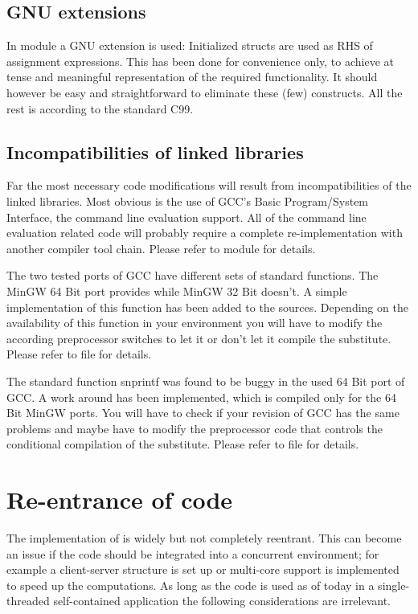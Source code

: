 \subsection{GNU extensions}

In module  a GNU extension is used: Initialized
structs are used as RHS of assignment expressions. This has been done
for convenience only, to achieve at tense and meaningful representation of
the required functionality. It should however be easy and straightforward
to eliminate these (few) constructs. All the rest is according to the
standard C99.


\subsection{Incompatibilities of linked libraries}

Far the most necessary code modifications will result from
incompatibilities of the linked libraries. Most obvious is the use of
GCC's Basic Program/System Interface, the command line evaluation support.
All of the command line evaluation related code will probably require a
complete re-implementation with another compiler tool chain. Please refer
to module  for details.

The two tested ports of GCC have different sets of standard functions. The
MinGW 64 Bit port provides  while MinGW 32 Bit doesn't. A
simple implementation of this function has been added to the \linnet{}
sources. Depending on the availability of this function in your
environment you will have to modify the according preprocessor switches to
let it or don't let it compile the substitute. Please refer to file
 for details.

The standard function snprintf was found to be buggy in the used 64 Bit
port of GCC. A work around has been implemented, which is compiled only
for the 64 Bit MinGW ports. You will have to check if your revision of GCC
has the same problems and maybe have to modify the preprocessor code that
controls the conditional compilation of the substitute. Please refer to
file  for details.


\section{Re-entrance of code}

The implementation of \linnet{} is widely but not completely reentrant.
This can become an issue if the code should be integrated into a
concurrent environment; for example a client-server structure is set up or
multi-core support is implemented to speed up the computations. As long as
the code is used as of today in a single-threaded self-contained
application the following considerations are irrelevant.

